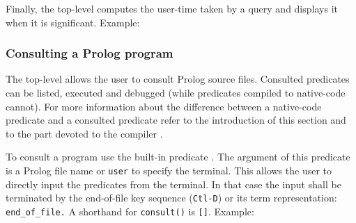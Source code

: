 Finally, the top-level computes the user-time  taken
by a query and displays it when it is significant. Example:

\begin{CodeTwoCols}
\SkipLine
{}
\SkipLine
{}
\end{CodeTwoCols}

\subsubsection{Consulting a Prolog program}
\label{Consulting-a-Prolog-program}
The top-level allows the user to consult Prolog source files. Consulted
predicates can be listed, executed and debugged (while predicates compiled
to native-code cannot). For more information about the difference between a
native-code predicate and a consulted predicate refer to the introduction of
this section  and to the part devoted
to the compiler .

To consult a program use the built-in predicate 
. The argument of this predicate is a Prolog file name or
\texttt{user} to specify the terminal. This allows the user to directly input
the predicates from the terminal. In that case the input shall be terminated
by the end-of-file key sequence (\texttt{Ctl-D}) or its term representation:
\texttt{end\_of\_file.} A shorthand for
\texttt{consult(}\texttt{)} is
\texttt{[}\texttt{]}. Example:

\begin{CodeTwoCols}
\SkipLine
{}
\SkipLine
{}
\SkipLine
{}
\SkipLine
{}
\SkipLine
{}
\SkipLine
{}
\end{CodeTwoCols}

